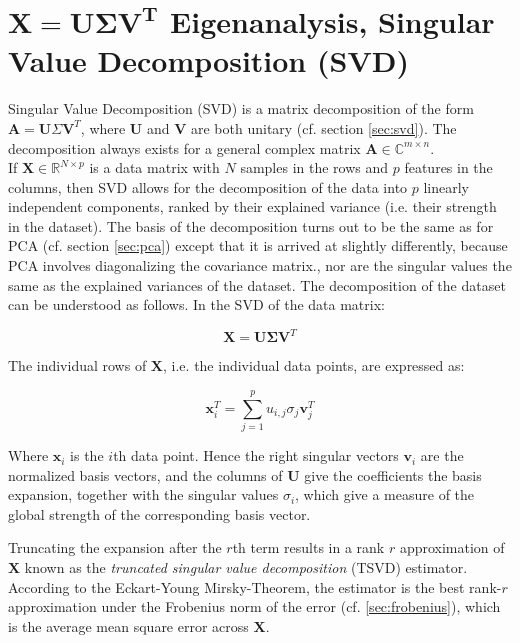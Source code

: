 \section{$\mathbf{X} = \mathbf{U\Sigma V^T}$ Eigenanalysis, Singular Value Decomposition (SVD)}
\label{sec:datasvd}

Singular Value Decomposition (SVD) is a matrix decomposition of the form $\mathbf{A}=\mathbf{U}\Sigma\mathbf{V}^T$, where $\mathbf{U}$ and $\mathbf{V}$ are both unitary (cf. section \ref{sec:svd}). The decomposition always exists for a general complex matrix $\mathbf{A}\in\mathbb{C}^{m\times n}$. 
\\

If $\mathbf{X}\in\mathbb{R}^{N\times p}$ is a data matrix with $N$ samples in the rows and $p$ features in the columns, then SVD allows for the decomposition of the data into $p$ linearly independent components, ranked by their explained variance (i.e. their strength in the dataset). The basis of the decomposition turns out to be the same as for PCA (cf. section \ref{sec:pca}) except that it is arrived at slightly differently, because PCA involves diagonalizing the covariance matrix., nor are the singular values the same as the explained variances of the dataset. The decomposition of the dataset can be understood as follows. In the SVD of the data matrix: 

\begin{equation}
\mathbf{X} = \mathbf{U}\mathbf{\Sigma}\mathbf{V}^T
\end{equation}

The individual rows of $\mathbf{X}$, i.e. the individual data points, are expressed as:

\begin{equation}
\mathbf{x}^T_i = \sum_{j=1}^p u_{i,j}\sigma_j\mathbf{v}_j^T
\end{equation}

Where $\mathbf{x}_i$ is the $i$th data point. Hence the right singular vectors $\mathbf{v}_i$ are the normalized basis vectors, and the columns of $\mathbf{U}$ give the coefficients the basis expansion, together with the singular values $\sigma_i$, which give a measure of the global strength of the corresponding basis vector. 

Truncating the expansion after the $r$th term results in a rank $r$ approximation of $\mathbf{X}$ known as the \textit{truncated singular value decomposition} (TSVD) estimator. According to the Eckart-Young Mirsky-Theorem, the estimator is the best rank-$r$ approximation under the Frobenius norm of the error (cf. \ref{sec:frobenius}), which is the average mean square error across $\mathbf{X}$. 

